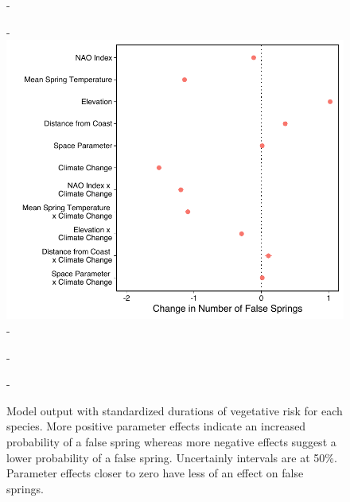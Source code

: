 \documentclass{article}\usepackage[]{graphicx}\usepackage[]{color}
\begin{document}
  
{\begin{figure} [H]
  -\begin{center}
  -\includegraphics[width=16cm]{..//figures/model_output_bern_50.pdf}
  -\caption{Model output with standardized durations of vegetative risk for each species. More positive parameter effects indicate an increased probability of a false spring whereas more negative effects suggest a lower probability of a false spring. Uncertainly intervals are at 50\%. Parameter effects closer to zero have less of an effect on false springs.}\label{fig:maineffects}
  -\end{center}
  -\end{figure}}
  
\end{document}

